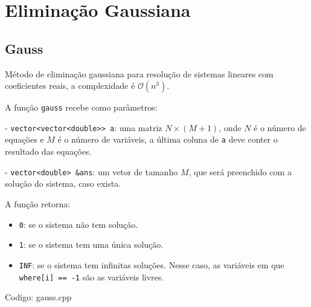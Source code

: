 \documentclass[10pt, a4paper, oneside]{book}
\begin{document}
\section{Eliminação Gaussiana}
\subsection{Gauss}


Método de eliminação gaussiana para resolução de sistemas lineares com coeficientes reais, a complexidade é $\mathcal{O}(n^3)$.



A função \texttt{gauss} recebe como parâmetros:

 - \texttt{vector<vector<double>> a}: uma matriz $N \times (M + 1)$, onde $N$ é o número de equações e $M$ é o número de variáveis, a última coluna de \texttt{a} deve conter o resultado das equações.

 - \texttt{vector<double> \&ans}: um vetor de tamanho $M$, que será preenchido com a solução do sistema, caso exista.



A função retorna:

\begin{itemize}
\item \texttt{0}: se o sistema não tem solução.
\item \texttt{1}: se o sistema tem uma única solução.
\item \texttt{INF}: se o sistema tem infinitas soluções. Nesse caso, as variáveis em que \texttt{where[i] == -1} são as variáveis livres.
\end{itemize}

\hfill

Codigo: gauss.cpp
\end{document}
